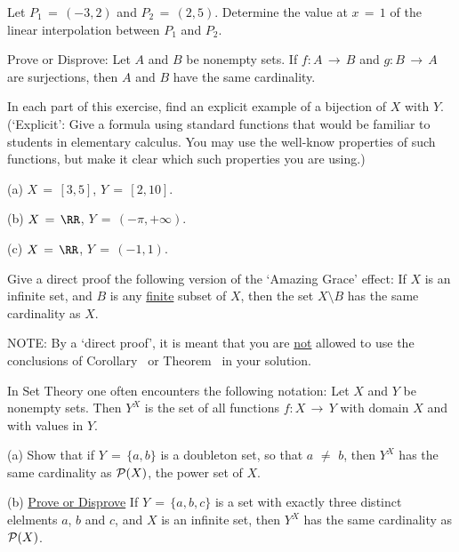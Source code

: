 \V
\V

\noindent \ExAo Let $P_{1} \,=\, (-3,2)$ and $P_{2} \,=\, (2,5)$. Determine the value at $x \,=\, 1$ of the linear interpolation between $P_{1}$ and $P_{2}$.

\V
\V

\noindent \ExAp Prove or Disprove: Let $A$ and $B$ be nonempty sets. If $f:A \,{\rightarrow}\, B$ and $g:B \,{\rightarrow}\, A$ are surjections, then $A$ and $B$ have the same cardinality.

\V
\V

\noindent \ExAq In each part of this exercise, find an explicit example of a bijection of $X$ with $Y$.
    (`Explicit': Give a formula using standard functions that would be familiar to students in elementary calculus.
    You may use the well-know properties of such functions, but make it clear which such properties you are using.)

\V

        (a) $X \,=\, [3,5]$, $Y \,=\, [2,10]$.

\V

        (b) $X \,=\, {\RR}$, $Y \,=\, (-{\pi},+{\infty})$.

\V

        (c) $X \,=\, {\RR}$, $Y \,=\, (-1,1)$.
        
\V
\V


\noindent \ExAr Give a direct proof the following version of the `Amazing Grace' effect:
    If $X$ is an infinite set, and $B$ is any \underline{finite} subset of $X$, then the set $X{\setminus}B$ has the same cardinality as $X$.

    NOTE: By a `direct proof', it is meant that you are \underline{not} allowed to use the conclusions of Corollary~ or Theorem~ in your solution.

\V
\V

\noindent \ExAs In Set Theory one often encounters the following notation: Let $X$ and $Y$ be nonempty sets.
    Then $Y^{X}$ is the set of all functions $f:X \,{\rightarrow}\, Y$ with domain $X$ and with values in $Y$.

\V

        (a) Show that if $Y \,=\, \{a,b\}$ is a doubleton set, so that $a \,\,{\neq}\,\, b$, then $Y^{X}$ has the same cardinality as ${\cal P}(X)$, the power set of $X$.

\V

        (b) \underline{Prove or Disprove} If $Y \,=\, \{a,b,c\}$ is a set with exactly three distinct elelments $a$, $b$ and $c$, and $X$ is an infinite set,
    then $Y^{X}$ has the same cardinality as ${\cal P}(X)$.

